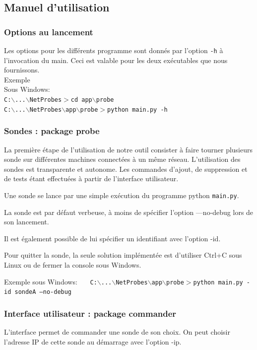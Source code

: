 \documentclass[a4paper,11pt]{article}
\begin{document}
\subsection{Manuel d'utilisation}

\subsubsection{Options au lancement}
Les options pour les différents programme sont donnés par l'option \texttt{-h} à l'invocation du main.
Ceci est valable pour les deux exécutables que nous fournissons.\\
Exemple\\
Sous Windows:\\
\texttt{{\color{blue}C:$\backslash$...$\backslash$NetProbes$>$}cd app$\backslash$probe}\\
\texttt{{\color{blue}C:$\backslash$...$\backslash$NetProbes$\backslash$app$\backslash$probe$>$}python main.py -h}

\subsubsection{Sondes : package probe}
La première étape de l'utilisation de notre outil consister à faire tourner plusieurs sonde sur différentes machines connectées à un même réseau. L'utilisation des sondes est transparente et autonome. Les commandes d'ajout, de suppression et de tests étant effectuées à partir de l'interface utilisateur.

Une sonde se lance par une simple exécution du programme python \texttt{main.py}.

La sonde est par défaut verbeuse, à moins de spécifier l'option ---no-debug lors de son lancement.

Il est également possible de lui spécifier un identifiant avec l'option -id.

Pour quitter la sonde, la seule solution implémentée est d'utiliser Ctrl+C sous Linux ou de fermer la console sous Windows.

Exemple sous Windows: \ \ \ \texttt{{\color{blue}C:$\backslash$...$\backslash$NetProbes$\backslash$app$\backslash$probe$>$}python main.py -id sondeA ---no-debug}

\subsubsection{Interface utilisateur : package commander}
L'interface permet de commander une sonde de son choix. On peut choisir l'adresse IP de cette sonde au démarrage avec l'option -ip.
\end{document}
